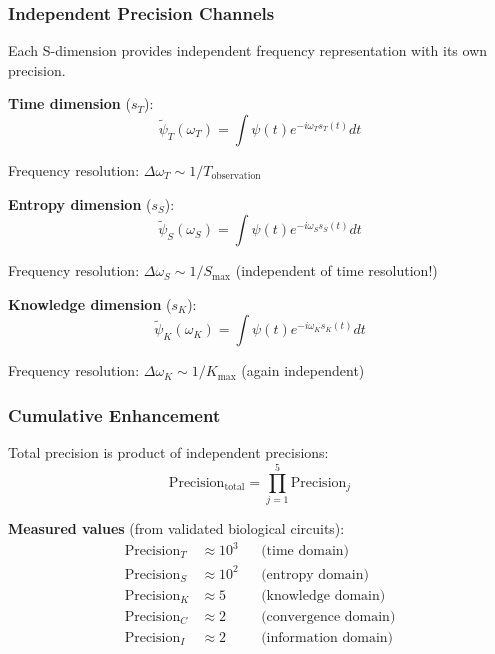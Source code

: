 \documentclass[11pt,onecolumn]{article}
\begin{document}
\subsubsection{Independent Precision Channels}

Each S-dimension provides independent frequency representation with its own precision.

\textbf{Time dimension} ($s_T$):
\begin{equation}
\tilde{\psi}_T(\omega_T) = \int \psi(t) e^{-i\omega_T s_T(t)} dt
\end{equation}

Frequency resolution: $\Delta \omega_T \sim 1/T_{\text{observation}}$

\textbf{Entropy dimension} ($s_S$):
\begin{equation}
\tilde{\psi}_S(\omega_S) = \int \psi(t) e^{-i\omega_S s_S(t)} dt
\end{equation}

Frequency resolution: $\Delta \omega_S \sim 1/S_{\text{max}}$ (independent of time resolution!)

\textbf{Knowledge dimension} ($s_K$):
\begin{equation}
\tilde{\psi}_K(\omega_K) = \int \psi(t) e^{-i\omega_K s_K(t)} dt
\end{equation}

Frequency resolution: $\Delta \omega_K \sim 1/K_{\text{max}}$ (again independent)

\subsubsection{Cumulative Enhancement}

Total precision is product of independent precisions:
\begin{equation}
\text{Precision}_{\text{total}} = \prod_{j=1}^{5} \text{Precision}_j
\end{equation}

\textbf{Measured values} (from validated biological circuits):
\begin{align}
\text{Precision}_T &\approx 10^3 &&\text{(time domain)} \\
\text{Precision}_S &\approx 10^2 &&\text{(entropy domain)} \\
\text{Precision}_K &\approx 5 &&\text{(knowledge domain)} \\
\text{Precision}_C &\approx 2 &&\text{(convergence domain)} \\
\text{Precision}_I &\approx 2 &&\text{(information domain)}
\end{align}
\end{document}
